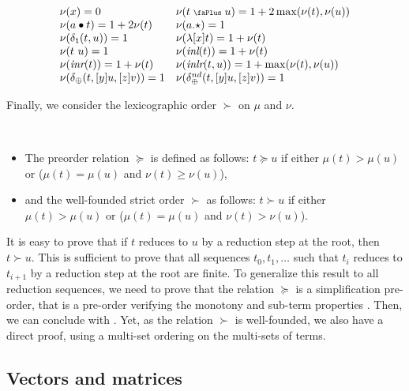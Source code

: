 \documentclass[screen, sigconf,authorversion,nonacm]{acmart}
\theoremstyle{acmdefinition}
\numberwithin{equation}{section}
\newcommand\abstr[1]{[#1]}
\newcommand\inl{\mbox{\it inl}}
\newcommand\inr{\mbox{\it inr}}
\newcommand\inlr{\mbox{\it inlr}}
\newcommand\plus{\mathrel{\text{\normalfont\scalebox{0.7}{\faPlus}}}}
\newcommand\one{\ensuremath{\mathtt 1}}
\newcommand\elimone{\delta_{\one}}
\newcommand\elimplus{\delta_{\oplus}}
\begin{document}
\begin{definition}
  \label{measureofaproofNu}~
  \[
    \begin{array}{ll}
      \nu(x) = 0 & \nu(t \plus u) = 1 + 2 \max(\nu(t), \nu(u)) \\
      \nu(a \bullet t) = 1 + 2 \nu(t) & \nu(a.\star) = 1  \\
      \nu(\elimone(t,u)) = 1 & \nu(\lambda \abstr{x} t) = 1 + \nu(t) \\
      \nu(t~u) = 1  & \nu(\inl(t)) = 1 + \nu(t)\\
      \nu(\inr(t)) = 1 + \nu(t) & \nu(\inlr(t,u)) = 1 + \max(\nu(t), \nu(u))\\
      \nu(\elimplus(t,\abstr{y} u,\abstr{z} v)) = 1 & \nu(\elimplus^{nd}(t,\abstr{y} u,\abstr{z}v)) = 1  
    \end{array}
  \]
\end{definition}

Finally, we consider the lexicographic order $\succ$ on $\mu$ and $\nu$.
\medskip

\begin{definition}~
\begin{itemize}
\item
The preorder relation $\succcurlyeq$ is defined as follows: $t
\succcurlyeq u$ if either $\mu(t) > \mu(u)$ or ($\mu(t) = \mu(u)$ and
$\nu(t) \geq \nu(u)$),
\item
and the well-founded strict order $\succ$ as follows: $t \succ u$ if
either $\mu(t) > \mu(u)$ or ($\mu(t) = \mu(u)$ and $\nu(t) > \nu(u)$).
\end{itemize}
\end{definition}

It is easy to prove that if $t$ reduces to $u$ by a reduction step at
the root, then $t \succ u$.  This is sufficient to prove that all
sequences $t_0, t_1, \ldots$ such that $t_i$ reduces to $t_{i+1}$ by a
reduction step at the root are finite. To generalize this result to
all reduction sequences, we need to prove that the relation
$\succcurlyeq$ is a simplification pre-order, that is a pre-order
verifying the monotony and sub-term properties \cite[Section 3,
Definition 3]{Nachum}. Then, we can conclude with \cite[Second
Termination Theorem]{Nachum}.  Yet, as the relation $\succ$ is
well-founded, we also have a direct proof, using a multi-set ordering
on the multi-sets of terms.

\subsection{Vectors and matrices}
\end{document}
